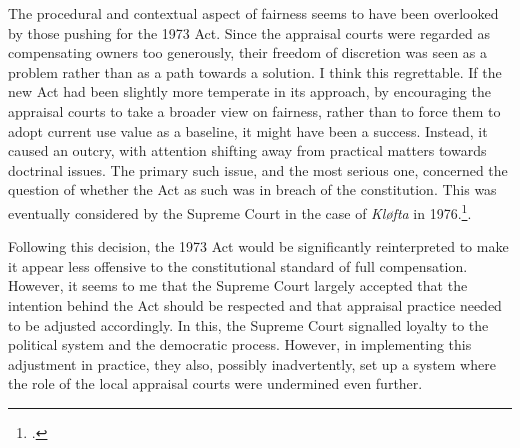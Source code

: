 
%

The procedural and contextual aspect of fairness seems to have been overlooked by those pushing for the 1973 Act. Since the appraisal courts were regarded as compensating owners too generously, their freedom of discretion was seen as a problem rather than as a path towards a solution. I think this regrettable. If the new Act had been slightly more temperate in its approach, by encouraging the appraisal courts to take a broader view on fairness, rather than to force them to adopt current use value as a baseline, it might have been a success. Instead, it caused an outcry, with attention shifting away from practical matters towards doctrinal issues. The primary such issue, and the most serious one, concerned the question of whether the Act as such was in breach of the constitution. This was eventually considered by the Supreme Court in the case of \emph{Kløfta} in 1976.\footnote{\cite{klofta76}.}. 

Following this decision, the 1973 Act would be significantly reinterpreted to make it appear less offensive to the constitutional standard of full compensation. However, it seems to me that the Supreme Court largely accepted that the intention behind the Act should be respected and that appraisal practice needed to be adjusted accordingly. In this, the Supreme Court signalled loyalty to the political system and the democratic process. However, in implementing this adjustment in practice, they also, possibly inadvertently, set up a system where the role of the local appraisal courts were undermined even further.

